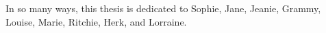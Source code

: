 In so many ways, this thesis is dedicated to Sophie, Jane, Jeanie, Grammy, Louise, Marie, Ritchie, Herk, and Lorraine.